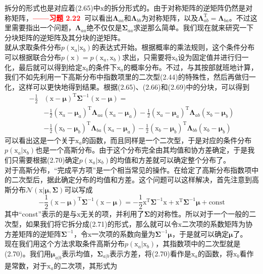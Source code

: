 \documentclass[b5paper]{book}
\numberwithin{equation}{chapter}
\newcommand {\bx} {\boldsymbol{\mathrm{x}}}
\newcommand {\rmT} {\mathrm{T}}
\newcommand {\bfMu} {\boldsymbol{\mu}}
\newcommand {\bfSigma} {\boldsymbol{\Sigma}}
\newcommand {\bfLambda} {\boldsymbol{\Lambda}}
\begin{document}
{\begin{equation}
	\end{equation}
	拆分的形式也是对应着(2.65)中$\bx$的拆分形式的。由于对称矩阵的逆矩阵仍然是对称矩阵，\textcolor{red}{\textbf{——习题 2.22\ }}可以看出$\boldsymbol{\Lambda}_{aa}$和$\boldsymbol{\Lambda}_{bb}$为对称矩阵，以及$\boldsymbol{\Lambda}_{ab}^{\rmT}=\boldsymbol{\Lambda}_{ba}$。不过这里需要指出一个问题，$\bfLambda_{aa}$绝不仅仅是$\bfSigma_{aa}$求逆那么简单。我们现在就来研究一下分块矩阵的逆矩阵及其分块的逆矩阵。\\
	\indent 就从求取条件分布$p(\bx_a|\bx_b)$的表达式开始。根据概率的乘法规则，这个条件分布可以根据联合分布$p(\bx)=p(\bx_a,\bx_b)$求出，只需要将$\bx_b$设为固定值并进行归一化，最后就可以得到给定$\bx_b$的条件下$\bx_a$的概率分布。不过，与其按部就班地计算，我们不如先利用一下高斯分布中指数项里的二次型(2.44)的特殊性，然后再做归一化，这样可以更快地得到结果。根据(2.65)、(2.66)和(2.69)中的分块，可以得到
	\begin{equation}
	\begin{split}
		-\frac{1}{2}&(\bx-\bfMu)^{\rmT}\bfSigma^{-1}(\bx-\bfMu) = \\
		&-\frac{1}{2}(\bx_a-\bfMu_a)^{\rmT}\bfLambda_{aa}(\bx_a-\bfMu_a)-\frac{1}{2}(\bx_a-\bfMu_a)^{\rmT}\bfLambda_{ab}(\bx_b-\bfMu_b) \\ &-\frac{1}{2}(\bx_b-\bfMu_b)^{\rmT}\bfLambda_{ba}(\bx_a-\bfMu_a)-\frac{1}{2}(\bx_b-\bfMu_b)^{\rmT}\bfLambda_{bb}(\bx_b-\bfMu_b)
	\end{split}
	\end{equation}
	可以看出这是一个关于$\bx_a$的函数，而且同样是一个二次型，于是对应的条件分布$p(\bx_a|\bx_b)$也是一个高斯分布。由于这个分布完全由其均值和协方差确定，于是我们只需要根据(2.70)确定$p(\bx_a|\bx_b)$的均值和方差就可以确定整个分布了。\\
	\indent 对于高斯分布，“完成平方项”是一个相当常见的操作。在给定了高斯分布指数项中的二次型后，据此确定分布的均值和方差。这个问题可以这样解决，首先注意到高斯分布$\mathcal{N}(\bx|\bfMu,\bfSigma)$可以写成
	\begin{equation}
		-\frac{1}{2}(\bx-\bfMu)^{\rmT}\bfSigma^{-1}(\bx-\bfMu)=-\frac{1}{2}\bx^{\rmT}\bfSigma^{-1}\bx + \bx^{\rmT}\bfSigma^{-1}\bfMu + \mathrm{const}
	\end{equation}
	其中“const”表示的是与$\bx$无关的项，并利用了$\bfSigma$的对称性。所以对于一个一般的二次型，如果我们将它拆分成(2.71)的形式，那么就可以令$\bx$二次项的系数矩阵为协方差矩阵的逆矩阵$\bfSigma^{-1}$，令$\bx$一次项的系数向量为$\bfSigma^{-1}\bfMu$，于是就可以确定$\bfMu$了。\\
	\indent 现在我们用这个方法求取条件高斯分布$p(\bx_a|\bx_b)$，其指数项中的二次型就是(2.70)。我们用$\bfMu_{a|b}$表示均值，$\bfSigma_{a|b}$表示方差，将(2.70)看作是$\bx_a$的函数，将$\bx_b$看作是常数，对于$\bx_a$的二次项，其形式为
}
\end{document}
